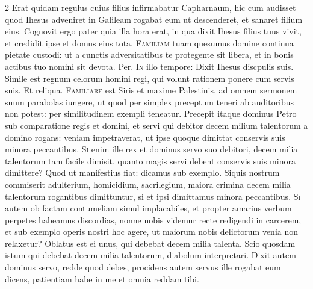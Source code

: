 \begin{multicols*}{2}
 Erat quidam regulus cuius filius infirmabatur Capharnaum, hic cum audisset quod Ihesus adveniret in Galileam rogabat eum ut descenderet, et sanaret filium eius.
 Cognovit ergo pater quia illa hora erat, in qua dixit Ihesus filius tuus vivit, et credidit ipse et domus eius tota.
\lettrine[lines=2]{\zallmancaps \color{Blue} F}{amiliam} tuam quesumus domine continua pietate custodi: ut a cunctis adversitatibus te protegente sit libera, et in bonis actibus tuo nomini sit devota. Per.
\lettrine[lines=2]{\zallmancaps \color{Red} I}{n} illo tempore: Dixit Ihesus discpulis suis. Simile est regnum celorum homini regi, qui volunt rationem ponere cum servis suis. Et reliqua.
\lettrine[lines=2]{\zallmancaps \color{Blue} F}{amiliare} est Siris et maxime Palestinis, ad omnem sermonem suum parabolas iungere, ut quod per simplex preceptum teneri ab auditoribus non potest: per similitudinem exempli teneatur. Precepit itaque dominus Petro sub comparatione regis et domini, et servi qui debitor decem milium talentorum a domino rogans: veniam impetraverat, ut ipse quoque dimittat conservis suis minora peccantibus.
\lettrine[lines=2]{\zallmancaps \color{Red} S}{i} enim ille rex et dominus servo suo debitori, decem milia talentorum tam facile dimisit, quanto magis servi debent conservis suis minora dimittere? Quod ut manifestius fiat: dicamus sub exemplo. Siquis nostrum commiserit adulterium, homicidium, sacrilegium, maiora crimina decem milia talentorum rogantibus dimittuntur, si et ipsi dimittamus minora peccantibus.
\lettrine[lines=2]{\zallmancaps \color{Blue} S}{i} autem ob factam contumeliam simul implacabiles, et propter amarius verbum perpetes habeamus discordias, nonne nobis videmur recte redigendi in carcerem, et sub exemplo operis nostri hoc agere, ut maiorum nobis delictorum venia non relaxetur? Oblatus est ei unus, qui debebat decem milia talenta. Scio quosdam istum qui debebat decem milia talentorum, diabolum interpretari.
 Dixit autem dominus servo, redde quod debes, procidens autem servus ille rogabat eum dicens, patientiam habe in me et omnia reddam tibi.

\end{multicols*}
